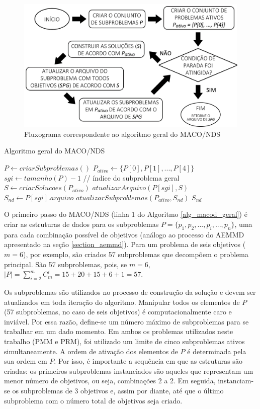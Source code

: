 \begin{figure}[!htbp]	
	\includegraphics[width=1\textwidth]{cap_algoritmo-proposto/figs/fluxo-algoritmo-geral}
	\caption{\label{img_fluxo_maconds}Fluxograma correspondente ao algoritmo geral do MACO/NDS}
\end{figure}

\begin{algorithm}[!htbp]
	\caption{Algoritmo geral do MACO/NDS}
	\label{alg_macod_geral}
	\begin{algorithmic}[1]
		\State $P \gets criarSubproblemas()$
		\State $P_{ativo} \gets \{P[0], P[1], ..., P[4]\}$
		\State $sgi \gets tamanho(P) - 1$ // índice do subproblema geral
		\State $S \gets criarSolucoes(P_{ativo})$
		\State $atualizarArquivo(P[sgi], S)$
		\State $S_{nd} \gets P[sgi].arquivo$
		\State $atualizarSubproblemas(P_{ativo}, S_{nd})$
		\EndWhile
		\State \Return $S_{nd}$
	\end{algorithmic}
\end{algorithm}

O primeiro passo do MACO/NDS (linha 1 do Algoritmo \ref{alg_macod_geral}) é criar as estruturas de dados para os subproblemas $P = \{p_1, p_2, ..., p_i, ..., p_n\}$, uma para cada combinação possível de objetivos (análogo ao processo do AEMMD apresentado na seção \ref{section_aemmd}). Para um problema de seis objetivos ($m = 6$), por exemplo, são criados 57 subproblemas que decompõem o problema principal. São 57 subproblemas, pois, se $m = 6$, $|P| = \sum_{i = 2}^m C_m^i = 15 + 20 + 15 + 6 + 1 = 57$.

Os subproblemas são utilizados no processo de construção da solução e devem ser atualizados em toda iteração do algoritmo. Manipular todos os elementos de $P$ (57 subproblemas, no caso de seis objetivos) é computacionalmente caro e inviável. Por essa razão, define-se um número máximo de subproblemas para se trabalhar em um dado momento. Em ambos os problemas utilizados neste trabalho (PMM e PRM), foi utilizado um limite de cinco subproblemas ativos simultaneamente. A ordem de ativação dos elementos de $P$ é determinada pela sua ordem em $P$. Por isso, é importante a sequência em que as estruturas são criadas: os primeiros subproblemas instanciados são aqueles que representam um menor número de  objetivos, ou seja, combinações 2 a 2. Em seguida, instanciam-se os subproblemas de 3 objetivos e, assim por diante, até que o último subproblema com o número total de objetivos seja criado.

